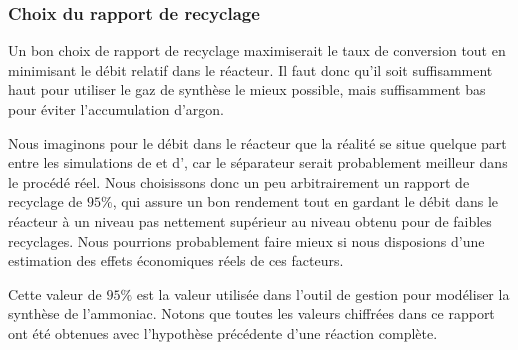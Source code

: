 \subsubsection{Choix du rapport de recyclage}

Un bon choix de rapport de recyclage maximiserait le taux de conversion
tout en minimisant le débit relatif dans le réacteur.
Il faut donc qu'il soit suffisamment haut pour utiliser le gaz de synthèse
le mieux possible, mais suffisamment bas pour éviter l'accumulation d'argon.

Nous imaginons pour le débit dans le réacteur
que la réalité se situe quelque part entre les simulations de \matlab{}
et d'\aspen{}, car le séparateur serait probablement meilleur
dans le procédé réel.
Nous choisissons donc un peu arbitrairement un rapport de recyclage de $95\%$,
qui assure un bon rendement tout en gardant le débit dans le réacteur à un
niveau pas nettement supérieur au niveau obtenu pour de faibles recyclages.
Nous pourrions probablement faire mieux si nous disposions d'une estimation
des effets économiques réels de ces facteurs.

Cette valeur de $95\%$ est la valeur utilisée dans l'outil de gestion
pour modéliser la synthèse de l'ammoniac. Notons que toutes les valeurs
chiffrées dans ce rapport ont été obtenues avec l'hypothèse précédente
d'une réaction complète.
